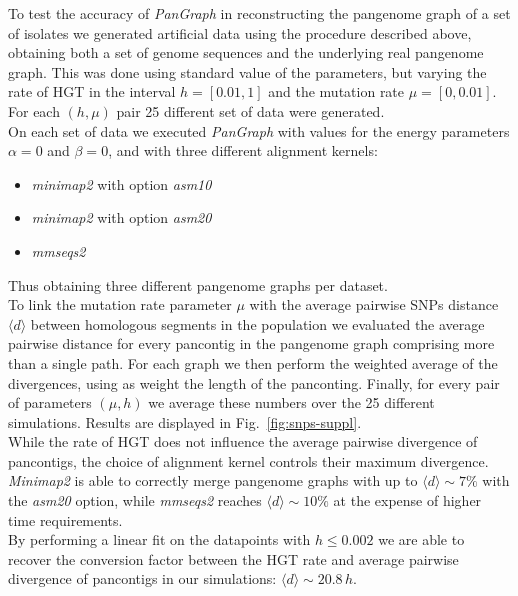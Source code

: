 \documentclass[aps,rmp,reprint,superscriptaddress,notitlepage,10pt,onecolumn]{revtex4-1}
\newcommand{\avg}[1]{\langle #1 \rangle}
\begin{document}
To test the accuracy of \textit{PanGraph} in reconstructing the pangenome graph of a set of isolates we generated artificial data using the procedure described above, obtaining both a set of genome sequences and the underlying real pangenome graph. This was done using standard value of the parameters, but varying the rate of HGT in the interval $h=[0.01,1]$ and the mutation rate $\mu=[0,0.01]$. For each $(h,\mu)$ pair 25 different set of data were generated.\\
On each set of data we executed \textit{PanGraph} with values for the energy parameters $\alpha=0$ and $\beta=0$, and with three different alignment kernels:
\begin{itemize}
    \item \textit{minimap2} with option \textit{asm10}
    \item \textit{minimap2} with option \textit{asm20}
    \item \textit{mmseqs2}
\end{itemize}
Thus obtaining three different pangenome graphs per dataset.\\
To link the mutation rate parameter $\mu$ with the average pairwise SNPs distance $\avg{d}$ between homologous segments in the population we evaluated the average pairwise distance for every pancontig in the pangenome graph comprising more than a single path. For each graph we then perform the weighted average of the divergences, using as weight the length of the panconting. Finally, for every pair of parameters $(\mu,h)$ we average these numbers over the 25 different simulations. Results are displayed in Fig.~\ref{fig:snps-suppl}.\\
While the rate of HGT does not influence the average pairwise divergence of pancontigs, the choice of alignment kernel controls their maximum divergence. \textit{Minimap2} is able to correctly merge pangenome graphs with up to $\avg{d} \sim 7\%$ with the \textit{asm20} option, while \textit{mmseqs2} reaches $\avg{d} \sim 10\%$ at the expense of higher time requirements.\\
By performing a linear fit on the datapoints with $h \leq 0.002$ we are able to recover the conversion factor between the HGT rate and average pairwise divergence of pancontigs in our simulations: $\avg{d} \sim 20.8 \, h$.
\end{document}

